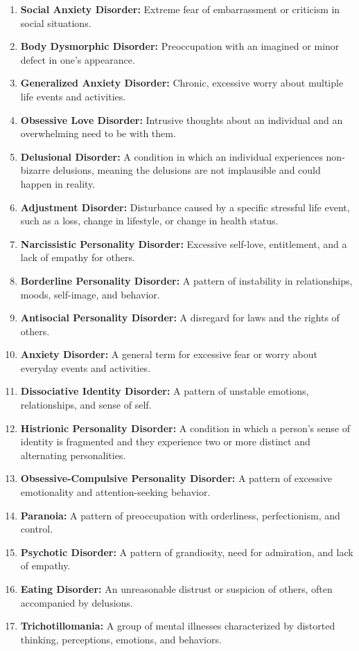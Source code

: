 \begin{enumerate}
    \item \textbf{Social Anxiety Disorder:} Extreme fear of embarrassment or criticism in social situations.
    \item \textbf{Body Dysmorphic Disorder:} Preoccupation with an imagined or minor defect in one’s appearance.
    \item \textbf{Generalized Anxiety Disorder:} Chronic, excessive worry about multiple life events and activities.
    \item \textbf{Obsessive Love Disorder:} Intrusive thoughts about an individual and an overwhelming need to be with them.
    \item \textbf{Delusional Disorder:} A condition in which an individual experiences non-bizarre delusions, meaning the delusions are not implausible and could happen in reality.
    \item \textbf{Adjustment Disorder:} Disturbance caused by a specific stressful life event, such as a loss, change in lifestyle, or change in health status.
    \item \textbf{Narcissistic Personality Disorder:} Excessive self-love, entitlement, and a lack of empathy for others.
    \item \textbf{Borderline Personality Disorder:} A pattern of instability in relationships, moods, self-image, and behavior.
    \item \textbf{Antisocial Personality Disorder:} A disregard for laws and the rights of others.
    \item \textbf{Anxiety Disorder:} A general term for excessive fear or worry about everyday events and activities.
    \item \textbf{Dissociative Identity Disorder:} A pattern of unstable emotions, relationships, and sense of self.
    \item \textbf{Histrionic Personality Disorder:} A condition in which a person's sense of identity is fragmented and they experience two or more distinct and alternating personalities.
    \item \textbf{Obsessive-Compulsive Personality Disorder:} A pattern of excessive emotionality and attention-seeking behavior.
    \item \textbf{Paranoia:} A pattern of preoccupation with orderliness, perfectionism, and control.
    \item \textbf{Psychotic Disorder:} A pattern of grandiosity, need for admiration, and lack of empathy.
    \item \textbf{Eating Disorder:} An unreasonable distrust or suspicion of others, often accompanied by delusions.
    \item \textbf{Trichotillomania:} A group of mental illnesses characterized by distorted thinking, perceptions, emotions, and behaviors.
\end{enumerate}

